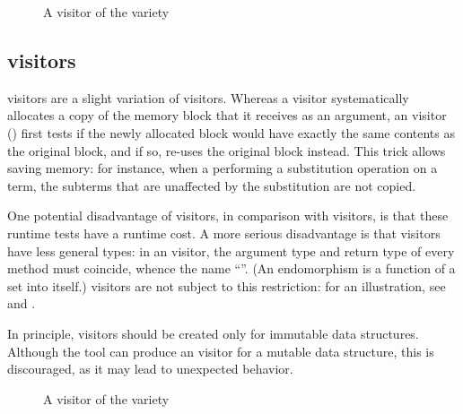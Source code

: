 \documentclass[11pt,a4paper,twoside]{article}
\begin{document}

\begin{figure}[p]
\vspace{-\baselineskip}
\caption{A visitor of the \mapendo variety}
\label{fig:expr00endo}
\end{figure}

\subsection{\mapendo visitors}
\label{sec:intro:endo}

\mapendo visitors are a slight variation of \map visitors. Whereas a \map
visitor systematically allocates a copy of the memory block that it receives
as an argument, an \mapendo visitor () first tests if the
newly allocated block would have exactly the same contents as the original
block, and if so, re-uses the original block instead.
%
This trick allows saving memory: for instance, when a performing a
substitution operation on a term, the subterms that are unaffected
by the substitution are not copied.

One potential disadvantage of \mapendo visitors, in comparison with \map
visitors, is that these runtime tests have a runtime cost. A more serious
disadvantage is that \mapendo visitors have less general types: in an \mapendo
visitor, the argument type and return type of every method must coincide,
whence the name ``\mapendo''.
%
(An endomorphism is a function of a set into itself.)
%
\map visitors are not subject to this restriction: for an illustration, see
 and .

In principle, \mapendo visitors should be created only for immutable data
structures. Although the tool can produce an \mapendo visitor for a mutable
data structure, this is discouraged, as it may lead to unexpected behavior.


\begin{figure}[p]
\vspace{-\baselineskip}
\caption{A visitor of the \reduce variety}
\label{fig:expr15}
\end{figure}
\end{document}
